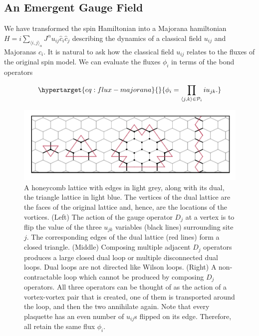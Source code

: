 \hypertarget{an-emergent-gauge-field}{%
\subsection{An Emergent Gauge Field}\label{an-emergent-gauge-field}}

We have transformed the spin Hamiltonian into a Majorana hamiltonian \(H = i \sum_{\langle i,j\rangle_\alpha} J^{\alpha} u_{ij} \hat{c}_i \hat{c}_j\) describing the dynamics of a classical field \(u_{ij}\) and Majoranas \(c_i\). It is natural to ask how the classical field \(u_{ij}\) relates to the fluxes of the original spin model. We can evaluate the fluxes \(\phi_i\) in terms of the bond operators

\begin{equation}\protect\hypertarget{eq:flux-majorana}{}{\phi_i = \prod_{\langle j,k\rangle \in \mathcal{P}_i} i u_{jk}.}\label{eq:flux-majorana}\end{equation}

\hypertarget{fig:gauge_symmetries}{%
\begin{figure}
\centering
\includegraphics[width=1\textwidth,height=\textheight]{figure_code/amk_chapter/intro/gauge_symmetries/gauge_symmetries}
\caption[{Gauge Symmetries}]{A honeycomb lattice with edges in light grey, along with its dual, the triangle lattice in light blue. The vertices of the dual lattice are the faces of the original lattice and, hence, are the locations of the vortices. (Left) The action of the gauge operator \(D_j\) at a vertex is to flip the value of the three \(u_{jk}\) variables (black lines) surrounding site \(j\). The corresponding edges of the dual lattice (red lines) form a closed triangle. (Middle) Composing multiple adjacent \(D_j\) operators produces a large closed dual loop or multiple disconnected dual loops. Dual loops are not directed like Wilson loops. (Right) A non-contractable loop which cannot be produced by composing \(D_j\) operators. All three operators can be thought of as the action of a vortex-vortex pair that is created, one of them is transported around the loop, and then the two annihilate again. Note that every plaquette has an even number of \(u_{ij}\)s flipped on its edge. Therefore, all retain the same flux \(\phi_i\).}
\label{fig:gauge_symmetries}
\end{figure}
}

